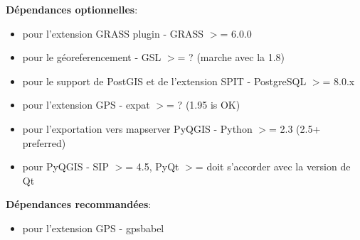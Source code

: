 %
%
%

\textbf{D\'ependances optionnelles}:

\begin{itemize}
\item pour l'extension GRASS plugin - GRASS $>$= 6.0.0
\item pour le g\'eoreferencement - GSL $>$= ? (marche avec la 1.8)
\item pour le support de PostGIS et de l'extension SPIT - PostgreSQL $>$= 8.0.x
\item pour l'extension GPS - expat $>$= ? (1.95 is OK)
\item pour l'exportation vers mapserver PyQGIS - Python $>$= 2.3 (2.5+
preferred)
\item pour PyQGIS - SIP $>$= 4.5, PyQt $>$= doit s'accorder avec la version de
Qt
\end{itemize}

\textbf{D\'ependances recommand\'ees}:

\begin{itemize}
\item pour l'extension GPS - gpsbabel
\end{itemize}

